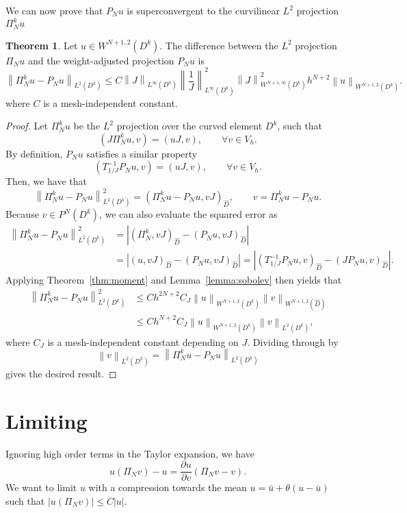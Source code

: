 \documentclass[preprint,10pt]{article}
\theoremstyle{definition}
\theoremstyle{lemma}
\theoremstyle{theorem}
\newtheorem{theorem}{Theorem}
\theoremstyle{assumption}
\renewcommand{\hat}{\widehat}
\newcommand{\pd}[2]{\frac{\partial#1}{\partial#2}}
\newcommand{\nor}[1]{\left\| #1 \right\|}
\newcommand{\LRp}[1]{\left( #1 \right)}
\newcommand{\LRb}[1]{\left| #1 \right|}
\begin{document}
We can now prove that $P_Nu$ is superconvergent to the curvilinear $L^2$ projection $\Pi_N^k u$
\begin{theorem}
Let $u \in W^{N+1,2}\LRp{D^k}$.  The difference between the $L^2$ projection $\Pi_Nu$ and the weight-adjusted projection $P_Nu$ is
\[
\nor{\Pi_N^k u - P_N u}_{L^2\LRp{D^k}} \leq C\nor{J}_{L^{\infty}\LRp{D^k}}  \nor{\frac{1}{J}}_{L^{\infty}\LRp{D^k}}^2 \nor{J}^2_{W^{N+1,\infty}\LRp{D^k}} h^{N+2}\nor{u}_{W^{N+1,2}\LRp{D^k}}.
\]
where $C$ is a mesh-independent constant.
\end{theorem}

\begin{proof}
Let $\Pi_N^k u$ be the $L^2$ projection over the curved element $D^k$, such that
\[
\LRp{J\Pi_N^k u,v} = \LRp{u J,v}, \qquad \forall v\in V_h.
\]
By definition, $P_N u$ satisfies a similar property
\[
\LRp{T_{1/J}^{-1} P_N u,v} = \LRp{u J,v}, \qquad \forall v\in V_h.
\]
Then, we have that
\[
\nor{\Pi_N^k  u - P_N u}_{L^2\LRp{D^k}}^2 = \LRp{\Pi_N^k  u - P_N u,vJ}_{\hat{D}}, \qquad v = \Pi_N^k  u - P_N u.
\]
Because $v \in P^N\LRp{D^k}$, we can also evaluate the squared error as
\begin{align*}
\nor{\Pi_N^k  u - P_N u}_{L^2\LRp{D^k}}^2 &= \LRb{\LRp{\Pi_N^k ,vJ}_{\hat{D}} - \LRp{P_N u,vJ}_{\hat{D}}}\\
& = \LRb{\LRp{u,vJ}_{\hat{D}} - \LRp{P_N u,vJ}_{\hat{D}}} = \LRb{\LRp{T_{1/J}^{-1}P_N u,v}_{\hat{D}} - \LRp{JP_N u,v}_{\hat{D}}}.
\end{align*}
Applying Theorem~\ref{thm:moment} and Lemma~\ref{lemma:sobolev} then yields that 
\begin{align*}
\nor{\Pi_N^k u - P_N u}_{L^2\LRp{D^k}}^2 &\leq Ch^{2N+2} C_J\nor{u}_{W^{N+1,2}\LRp{D^k}}
\nor{v}_{W^{N+1,2}\LRp{\hat{D}}} \\
&\leq Ch^{N+2} C_J\nor{u}_{W^{N+1,2}\LRp{D^k}}\nor{v}_{L^2\LRp{D^k}},
\end{align*}
where $C_J$ is a mesh-independent constant depending on $J$.  Dividing through by 
\[
\nor{v}_{L^2\LRp{D^k}} = \nor{\Pi^k_N u - P_N u}_{L^2\LRp{D^k}}
\]
 gives the desired result.  %
\end{proof}

\section{Limiting}

Ignoring high order terms in the Taylor expansion, we have
\[
u\LRp{\Pi_N v} - u = \pd{u}{v} \LRp{\Pi_Nv - v}.
\]
We want to limit $u$ with a compression towards the mean $u = \bar{u} + \theta(u-\bar{u})$ such that $\LRb{u\LRp{\Pi_N v}} \leq C\LRb{u}$.  
\end{document}
